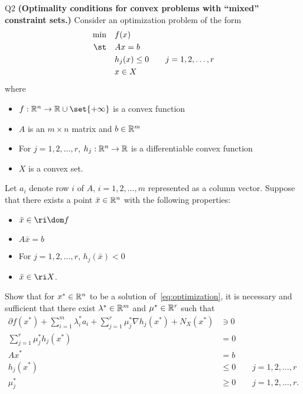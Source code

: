 \documentclass{article}
\begin{document}
\begin{problem}
    {Q2}
    {\bf (Optimality conditions for convex problems with ``mixed'' constraint sets.)}
    Consider an optimization problem of the form
    \begin{equation}
        \begin{aligned}
            \min & \quad f(x) \\
            \st & \quad Ax=b \\
            & \quad h_j(x)\leq 0 \qquad j=1,2,\dots,r \\
            & \quad x\in X
        \end{aligned}
        \label{eq:optimization}
    \end{equation}
    where
    \begin{itemize}
        \item $f:\R^n\rightarrow\R\cup\set{+\infty}$ is a convex function
        \item $A$ is an $m\times n$ matrix and $b\in\mathbb{R}^m$
        \item For $j=1,2,\dots,r$, $h_j:\mathbb{R}^n\rightarrow\mathbb{R}$ is a differentiable convex function
        \item $X$ is a convex set.
    \end{itemize}
    Let $a_i$ denote row $i$ of $A$, $i=1,2,\dots,m$ represented as a column vector. Suppose that there exists a point $\bar{x}\in\mathbb{R}^n$ with the following properties:
    \begin{itemize}
        \item $\bar{x}\in\ri\dom f$
        \item $A\bar{x}=b$
        \item For $j=1,2,\dots,r$, $h_j(\bar{x})<0$
        \item $\bar{x}\in\ri X$.
    \end{itemize}
    Show that for $x^*\in\mathbb{R}^n$ to be a solution of~\cref{eq:optimization}, it is necessary and sufficient that there exist $\lambda^*\in\mathbb{R}^m$ and $\mu^*\in\mathbb{R}^r$ such that
    \begin{align*}
        \partial f(x^*)+\sum_{i=1}^{m}\lambda^*_i a_i+\sum_{j=1}^{r}\mu^*_j\nabla h_j(x^*)+N_X(x^*) &\ni 0\\
        \sum_{j=1}^{r}\mu^*_j h_j(x^*) &= 0 \\
        Ax^* &= b \\
        h_j(x^*) &\leq 0 \qquad j=1,2,\dots,r \\
        \mu^*_j &\geq 0 \qquad j=1,2,\dots,r.
    \end{align*}
\end{problem}
\end{document}

